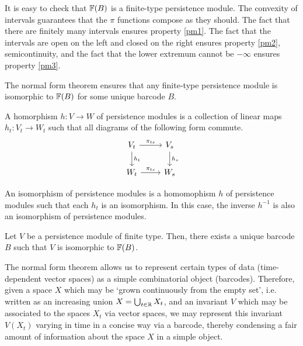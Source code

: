 It is easy to check that $\mathbb{F}(B)$ is a finite-type persistence module. The convexity of intervals guarantees that the $\pi$ functions compose as they should. The fact that there are finitely many intervals ensures property \ref{pm1}. The fact that the intervals are open on the left and closed on the right ensures property \ref{pm2}, semicontinuity, and the fact that the lower extremum cannot be $-\infty$ ensures property \ref{pm3}.

The normal form theorem ensures that any finite-type persistence module is isomorphic to $\mathbb{F}(B)$ for some unique barcode $B$.

\begin{definition}
A homorphism $h \colon V \to W$ of persistence modules is a collection of linear maps $h_t \colon V_t \to W_t$ such that all diagrams of the following form commute.
\begin{equation}
\begin{tikzcd}
V_t \arrow[d, "h_t"] \arrow[r, "\pi_{ts}"] & V_s \arrow[d, "h_s"] \\
W_t \arrow[r, "\pi_{ts}"]                  & W_s                 
\end{tikzcd}
\end{equation}

An isomorphism of persistence modules is a homomophism $h$ of persistence modules such that each $h_t$ is an isomorphism. In this case, the inverse $h^{-1}$ is also an isomorphism of persistence modules.
\end{definition}

\begin{theorem}
Let $V$ be a persistence module of finite type. Then, there exists a unique barcode $B$ such that $V$ is isomorphic to $\mathbb{F}(B)$.
\end{theorem}

The normal form theorem allows us to represent certain types of data (time-dependent vector spaces) as a simple combinatorial object (barcodes). Therefore, given a space $X$ which may be `grown continuously from the empty set', i.e. written as an increasing union $X = \bigcup_{t \in \mathbb{R}} X_t$, and an invariant $V$ which may be associated to the spaces $X_t$ via vector spaces, we may represent this invariant $V(X_t)$ varying in time in a concise way via a barcode, thereby condensing a fair amount of information about the space $X$ in a simple object.